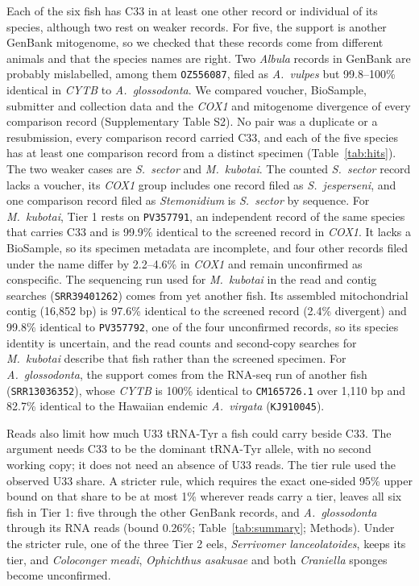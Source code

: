 \documentclass[11pt, a4paper]{article}
\begin{document}
Each of the six fish has C33 in at least one other record or individual of its species, although two rest on weaker records. For five, the support is another GenBank mitogenome, so we checked that these records come from different animals and that the species names are right. Two \textit{Albula} records in GenBank are probably mislabelled, among them \texttt{OZ556087}, filed as \textit{A.\ vulpes} but 99.8--100\% identical in \textit{CYTB} to \textit{A.\ glossodonta}. We compared voucher, BioSample, submitter and collection data and the \textit{COX1} and mitogenome divergence of every comparison record (Supplementary Table S2). No pair was a duplicate or a resubmission, every comparison record carried C33, and each of the five species has at least one comparison record from a distinct specimen (Table~\ref{tab:hits}). The two weaker cases are \textit{S.\ sector} and \textit{M.\ kubotai}. The counted \textit{S.\ sector} record lacks a voucher, its \textit{COX1} group includes one record filed as \textit{S.\ jesperseni}, and one comparison record filed as \textit{Stemonidium} is \textit{S.\ sector} by sequence. For \textit{M.\ kubotai}, Tier 1 rests on \texttt{PV357791}, an independent record of the same species that carries C33 and is 99.9\% identical to the screened record in \textit{COX1}. It lacks a BioSample, so its specimen metadata are incomplete, and four other records filed under the name differ by 2.2--4.6\% in \textit{COX1} and remain unconfirmed as conspecific. The sequencing run used for \textit{M.\ kubotai} in the read and contig searches (\texttt{SRR39401262}) comes from yet another fish. Its assembled mitochondrial contig (16,852 bp) is 97.6\% identical to the screened record (2.4\% divergent) and 99.8\% identical to \texttt{PV357792}, one of the four unconfirmed records, so its species identity is uncertain, and the read counts and second-copy searches for \textit{M.\ kubotai} describe that fish rather than the screened specimen. For \textit{A.\ glossodonta}, the support comes from the RNA-seq run of another fish (\texttt{SRR13036352}), whose \textit{CYTB} is 100\% identical to \texttt{CM165726.1} over 1,110 bp and 82.7\% identical to the Hawaiian endemic \textit{A.\ virgata} (\texttt{KJ910045}).

Reads also limit how much U33 tRNA-Tyr a fish could carry beside C33. The argument needs C33 to be the dominant tRNA-Tyr allele, with no second working copy; it does not need an absence of U33 reads. The tier rule used the observed U33 share. A stricter rule, which requires the exact one-sided 95\% upper bound on that share to be at most 1\% wherever reads carry a tier, leaves all six fish in Tier 1: five through the other GenBank records, and \textit{A.\ glossodonta} through its RNA reads (bound 0.26\%; Table~\ref{tab:summary}; Methods). Under the stricter rule, one of the three Tier 2 eels, \textit{Serrivomer lanceolatoides}, keeps its tier, and \textit{Coloconger meadi}, \textit{Ophichthus asakusae} and both \textit{Craniella} sponges become unconfirmed.
\end{document}
